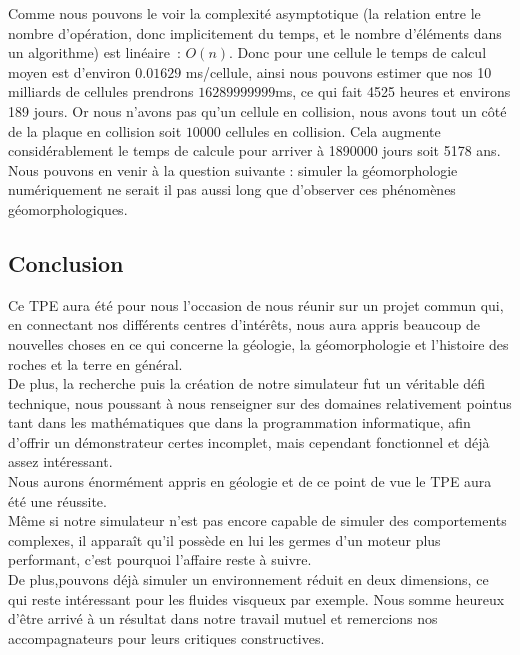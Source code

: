 \documentclass[a4paper,11pt]{article}
\begin{document}
Comme nous pouvons le voir la complexité asymptotique (la relation entre le nombre d'opération, donc implicitement du temps, et le nombre d'éléments dans un algorithme) est linéaire~: $O(n)$.
Donc pour une cellule le temps de calcul moyen est d'environ $0.01629$ ms/cellule, ainsi nous pouvons estimer que nos 10 milliards de cellules prendrons $16289999999$ms, ce qui fait 4525 heures et environs 189 jours.
Or nous n'avons pas qu'un cellule en collision, nous avons tout un côté de la plaque en collision soit $10000$ cellules en collision.
Cela augmente considérablement le temps de calcule pour arriver à 1890000 jours soit 5178 ans.
Nous pouvons en venir à la question suivante : simuler la géomorphologie numériquement ne serait il pas aussi long que d'observer ces phénomènes géomorphologiques.

\subsection{Conclusion}

Ce TPE aura été pour nous l'occasion de nous réunir sur un projet commun qui, en connectant nos différents centres d’intérêts, nous aura appris beaucoup de nouvelles choses en ce qui concerne la géologie, la géomorphologie et l'histoire des roches et la terre en général. \\
De plus, la recherche puis la création de notre simulateur fut un véritable défi technique, nous poussant à nous renseigner sur des domaines relativement pointus tant dans les mathématiques que dans la programmation informatique, afin d'offrir un démonstrateur certes incomplet, mais cependant fonctionnel et déjà assez intéressant. \\
Nous aurons énormément appris en géologie et de ce point de vue le TPE aura été une réussite. \\
Même si notre simulateur n'est pas encore capable de simuler des comportements complexes, il apparaît qu'il possède en lui les germes d'un moteur plus performant, c'est pourquoi l'affaire reste à suivre. \\ De plus,pouvons déjà simuler un environnement réduit en deux dimensions, ce qui reste intéressant pour les fluides visqueux par exemple. Nous somme heureux d'être arrivé à un résultat dans notre travail mutuel et remercions nos accompagnateurs pour leurs critiques constructives.
\end{document}

